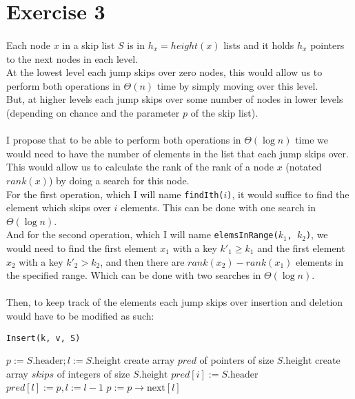 \documentclass[../main.tex]{subfiles}
\begin{document}
\section{Exercise 3}
\label{sec:ex3}

\paragraph{} Each node \(x\) in a skip list \(S\) is in \(h_{x} = height(x)\) lists and it holds \(h_{x}\) pointers to the next nodes in each level. \\
At the lowest level each jump skips over zero nodes, this would allow us to perform both operations in \(\Theta(n)\) time by simply moving over this level. \\
But, at higher levels each jump skips over some number of nodes in lower levels (depending on chance and the parameter \(p\) of the skip list).

\paragraph{} I propose that to be able to perform both operations in \(\Theta(\log n)\) time we would need to have the number of elements in the list that each jump skips over. This would allow us to calculate the rank of the rank of a node \(x\) (notated \(rank(x)\)) by doing a search for this node. \\
For the first operation, which I will name \texttt{findIth(\(i\))}, it would suffice to find the element which skips over \(i\) elements. This can be done with one search in \(\Theta(\log n)\). \\
And for the second operation, which I will name \texttt{elemsInRange(\(k_{1}\), \(k_{2}\))}, we would need to find the first element \(x_{1}\) with a key \(k'_{1} \geq k_{1}\) and the first element \(x_{2}\) with a key \(k'_{2} > k_{2}\), and then there are \(rank(x_{2}) - rank(x_{1})\) elements in the specified range. Which can be done with two searches in \(\Theta(\log n)\). \\ %

\paragraph{} Then, to keep track of the elements each jump skips over insertion and deletion would have to be modified as such:

\begin{algorithm}
\caption{\texttt{Insert(k, v, S)}}
\label{alg:ex2.insert}
\begin{algorithmic}
  \State \(p := S.\text{header}; l := S.\text{height}\)
  \State create array \(pred\) of pointers of size \(S.\text{height}\)
  \State create array \(skips\) of integers of size \(S.\text{height}\)
    \State \(pred[i] := S.\text{header}\)
  \EndFor
      \State \(pred[l] := p, l := l - 1\)
    \Else
      \State \(p := p \rightarrow \text{next}[l]\)
    \EndIf
  \EndWhile
\end{algorithmic}
\end{algorithm}
\end{document}
